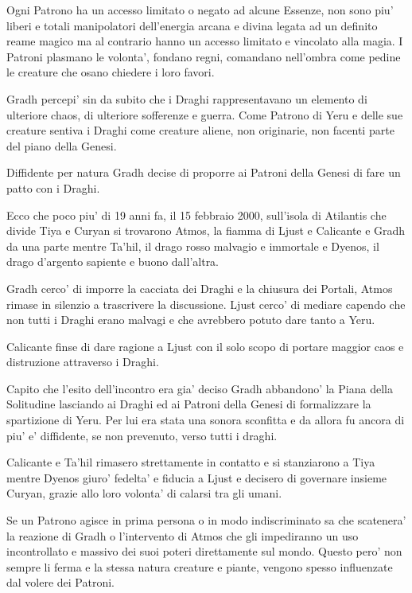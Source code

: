 \documentclass[a4paper,11pt,twoside,openany]{book}
\begin{document}
{Ogni Patrono ha un accesso limitato o negato ad alcune Essenze, non sono piu' liberi e totali manipolatori dell'energia arcana e divina legata ad un definito reame magico ma al contrario hanno un accesso limitato e vincolato alla magia. 
I Patroni plasmano le volonta', fondano regni, comandano nell'ombra come pedine le creature che osano chiedere i loro favori.

Gradh percepi' sin da subito che i Draghi rappresentavano un elemento di ulteriore chaos, di ulteriore sofferenze e guerra. Come Patrono di Yeru e delle sue creature sentiva i Draghi come creature aliene, non originarie, non facenti parte del piano della Genesi.

Diffidente per natura Gradh decise di proporre ai Patroni della Genesi di fare un patto con i Draghi.

Ecco che poco piu' di 19 anni fa, il 15 febbraio 2000, sull'isola di Atilantis che divide Tiya e Curyan si trovarono Atmos, la fiamma di Ljust e Calicante e Gradh da una parte mentre Ta'hil, il drago rosso malvagio e immortale e Dyenos, il drago d'argento sapiente e buono dall'altra.

Gradh cerco' di imporre la cacciata dei Draghi e la chiusura dei Portali, Atmos rimase in silenzio a trascrivere la discussione. Ljust cerco' di mediare capendo che non tutti i Draghi erano malvagi e che avrebbero potuto dare tanto a Yeru.

Calicante finse di dare ragione a Ljust con il solo scopo di portare maggior caos e distruzione attraverso i Draghi.

Capito che l'esito dell'incontro era gia' deciso Gradh abbandono' la Piana della Solitudine lasciando ai Draghi ed ai Patroni della Genesi di formalizzare la spartizione di Yeru. Per lui era stata una sonora sconfitta e da allora fu ancora di piu' e' diffidente, se non prevenuto, verso tutti i draghi.

Calicante e Ta'hil rimasero strettamente in contatto e si stanziarono a Tiya mentre Dyenos giuro' fedelta' e fiducia a Ljust e decisero di governare insieme Curyan, grazie allo loro volonta' di calarsi tra gli umani.

Se un Patrono agisce in prima persona o in modo indiscriminato sa che scatenera' la reazione di Gradh o l'intervento di Atmos che gli impediranno un uso incontrollato e massivo dei suoi poteri direttamente sul mondo. Questo pero' non sempre li ferma e la stessa natura creature e piante, vengono spesso influenzate dal volere dei Patroni.

}
\end{document}
